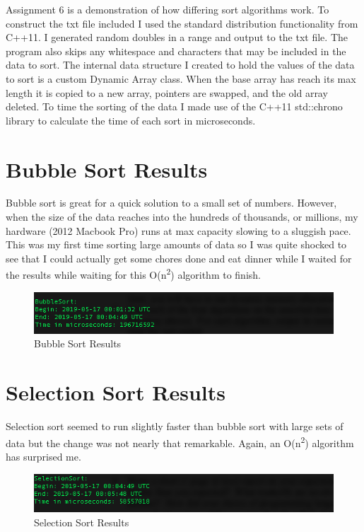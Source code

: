 Assignment 6 is a demonstration of how differing sort algorithms work. To construct the txt file included I used the standard distribution functionality from C++11. I generated random doubles in a range and output to the txt file. The program also skips any whitespace and characters that may be included in the data to sort.   
The internal data structure I created to hold the values of the data to sort is a custom Dynamic Array class. When the base array has reach its max length it is copied to a new array, pointers are swapped, and the old array deleted.
To time the sorting of the data I made use of the C++11 std::chrono library to calculate the time of each sort in microseconds.
 

\section{Bubble Sort Results}\label{bsresults}
Bubble sort is great for a quick solution to a small set of numbers. However, when the size of the data reaches into the hundreds of thousands, or millions, my hardware (2012 Macbook Pro) runs at max capacity slowing to a sluggish pace. This was my first time sorting large amounts of data so I was quite shocked to see that I could actually get some chores done and eat dinner while I waited for the results while waiting for this O(n\textsuperscript{2}) algorithm to finish.\newline

\begin{figure}[htbp]
\centering
  \includegraphics[width=.7\linewidth]{bs.png}
 \caption{Bubble Sort Results}
\end{figure}

\section{Selection Sort Results}\label{ssresults}
Selection sort seemed to run slightly faster than bubble sort with large sets of data but the change was not nearly that remarkable. Again, an O(n\textsuperscript{2}) algorithm has surprised me.\newline

\begin{figure}[htbp]
\centering
  \includegraphics[width=.7\linewidth]{ss.png}
 \caption{Selection Sort Results}
\end{figure}

